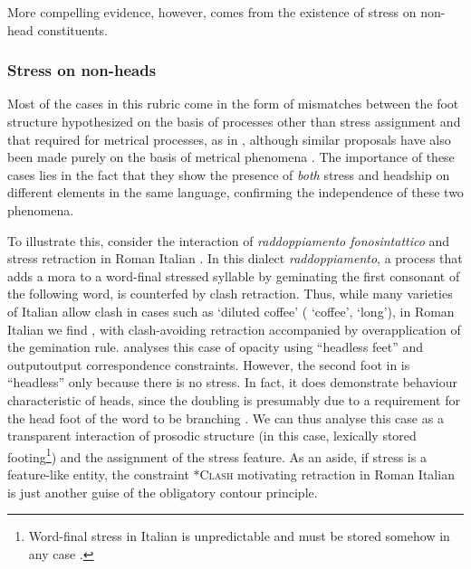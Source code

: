 More compelling evidence, however, comes from the existence of stress on non\hyp head constituents.

\subsubsection{Stress on non\hyp heads}
\label{sec:stress-nonhyp-heads}

Most of the cases in this rubric come in the form of mismatches between the foot structure hypothesized on the basis of processes other than stress assignment and that required for metrical processes, as in \citet{downing06,vaysman08}, although similar proposals have also been made purely on the basis of metrical phenomena \citep{hyde,hyde06:_towar,iosad08:_compl}. The importance of these cases lies in the fact that they show the presence of \emph{both} stress and headship on different elements in the same language, confirming the independence of these two phenomena.

To illustrate this, consider the interaction of \textitalian{\emph{raddoppiamento fonosintattico}} and stress retraction in Roman Italian \citep{garvin,kramer09:_italian}. In this dialect \textitalian{\emph{raddoppiamento}}, a process that adds a mora to a word\hyp final stressed syllable by geminating the first consonant of the following word, is counterfed by clash retraction. Thus, while many varieties of Italian allow clash in cases such as  `diluted coffee' (\ipa{[kafˈfɛ]} `coffee', \ipa{[ˈluŋɡo]} `long'), in Roman Italian we find , with clash-avoiding retraction accompanied by overapplication of the gemination rule. \citet{kramer09:_italian} analyses this case of opacity using \enquote{headless feet} and output\endash output correspondence constraints. However, the second foot in  is \enquote{headless} only because there is no stress. In fact, it does demonstrate behaviour characteristic of heads, since the doubling is presumably due to a requirement for the head foot of the word to be branching \citep{dresher-vdhulst}. We can thus analyse this case as a transparent interaction of prosodic structure (in this case, lexically stored footing\footnote{Word\hyp final stress in Italian is unpredictable and must be stored somehow in any case \citep{italianstress,kramer09:_italian}.}) and the assignment of the stress feature. As an aside, if stress is a feature\hyp like entity, the constraint \textsc{*Clash} motivating retraction in Roman Italian is just another guise of the obligatory contour principle.

